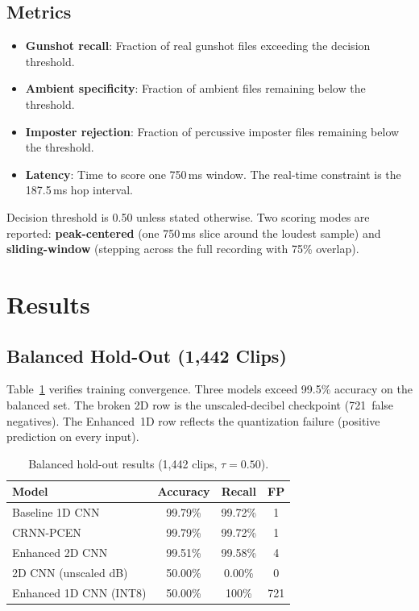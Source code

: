 \documentclass[conference]{IEEEtran}
\begin{document}
\subsection{Metrics}
\begin{itemize}
    \item \textbf{Gunshot recall}: Fraction of real gunshot files exceeding the decision threshold.
    \item \textbf{Ambient specificity}: Fraction of ambient files remaining below the threshold.
    \item \textbf{Imposter rejection}: Fraction of percussive imposter files remaining below the threshold.
    \item \textbf{Latency}: Time to score one 750\,ms window. The real-time constraint is the 187.5\,ms hop interval.
\end{itemize}
Decision threshold is 0.50 unless stated otherwise. Two scoring modes are reported: \textbf{peak-centered} (one 750\,ms slice around the loudest sample) and \textbf{sliding-window} (stepping across the full recording with 75\% overlap).

\section{Results}
\label{sec:results}

\subsection{Balanced Hold-Out (1{,}442 Clips)}
Table~\ref{tab:holdout} verifies training convergence. Three models exceed 99.5\% accuracy on the balanced set. The broken 2D row is the unscaled-decibel checkpoint (721~false negatives). The Enhanced~1D row reflects the quantization failure (positive prediction on every input).

\begin{table}[!t]
\centering
\caption{Balanced hold-out results (1{,}442 clips, $\tau = 0.50$).}
\label{tab:holdout}
\footnotesize
\begin{tabular}{lccc}
\toprule
\textbf{Model} & \textbf{Accuracy} & \textbf{Recall} & \textbf{FP} \\
\midrule
Baseline 1D CNN & 99.79\% & 99.72\% & 1 \\
CRNN-PCEN & 99.79\% & 99.72\% & 1 \\
Enhanced 2D CNN & 99.51\% & 99.58\% & 4 \\
2D CNN (unscaled dB) & 50.00\% & 0.00\% & 0 \\
Enhanced 1D CNN (INT8) & 50.00\% & 100\% & 721 \\
\bottomrule
\end{tabular}
\end{table}
\end{document}
